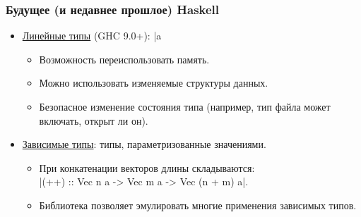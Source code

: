 \documentclass[11pt]{beamer}
\begin{document}
\begin{frame}[fragile]
  \frametitle{Будущее (и недавнее прошлое) Haskell}
  \begin{itemize}
    \item \href{https://downloads.haskell.org/ghc/latest/docs/users_guide/exts/linear_types.html}{Линейные типы} (GHC 9.0+): \haskinline|a %
          \begin{itemize}
            \item Возможность переиспользовать память.
            \item Можно использовать изменяемые структуры данных.
            \item Безопасное изменение состояния типа (например, тип файла может включать, открыт ли он).
          \end{itemize}
          \pause
    \item \href{https://ghc.serokell.io/dh}{Зависимые типы}: типы, параметризованные значениями.
          \begin{itemize}
            \item При конкатенации векторов длины складываются:\\
                  \haskinline|(++) :: Vec n a -> Vec m a -> Vec (n + m) a|.
            \item Библиотека  позволяет эмулировать многие применения зависимых типов.
          \end{itemize}
  \end{itemize}
\end{frame}
\end{document}
